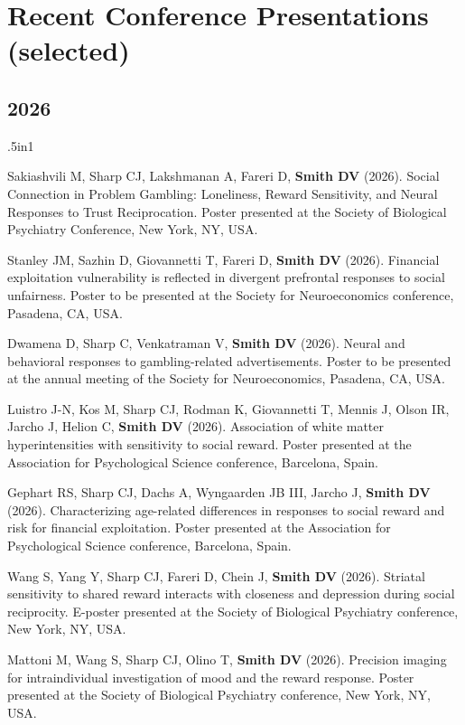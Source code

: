 \documentclass[11pt, letterpaper]{article}
\begin{document}

\section*{Recent Conference Presentations (selected)}
\label{sec:conferences}


\subsection*{2026}
\begin{hangparas}{.5in}{1}

Sakiashvili M, Sharp CJ, Lakshmanan A, Fareri D, \textbf{Smith DV} (2026). Social Connection in Problem Gambling: Loneliness, Reward Sensitivity, and Neural Responses to Trust Reciprocation. Poster presented at the Society of Biological Psychiatry Conference, New York, NY, USA.

Stanley JM, Sazhin D, Giovannetti T, Fareri D, \textbf{Smith DV} (2026). Financial exploitation vulnerability is reflected in divergent prefrontal responses to social unfairness. Poster to be presented at the Society for Neuroeconomics conference, Pasadena, CA, USA.

Dwamena D, Sharp C, Venkatraman V, \textbf{Smith DV} (2026). Neural and behavioral responses to gambling-related advertisements. Poster to be presented at the annual meeting of the Society for Neuroeconomics, Pasadena, CA, USA.

Luistro J-N, Kos M, Sharp CJ, Rodman K, Giovannetti T, Mennis J, Olson IR, Jarcho J, Helion C, \textbf{Smith DV} (2026). Association of white matter hyperintensities with sensitivity to social reward. Poster presented at the Association for Psychological Science conference, Barcelona, Spain.

Gephart RS, Sharp CJ, Dachs A, Wyngaarden JB III, Jarcho J, \textbf{Smith DV} (2026). Characterizing age-related differences in responses to social reward and risk for financial exploitation. Poster presented at the Association for Psychological Science conference, Barcelona, Spain.

Wang S, Yang Y, Sharp CJ, Fareri D, Chein J, \textbf{Smith DV} (2026). Striatal sensitivity to shared reward interacts with closeness and depression during social reciprocity. E-poster presented at the Society of Biological Psychiatry conference, New York, NY, USA.

Mattoni M, Wang S, Sharp CJ, Olino T, \textbf{Smith DV} (2026). Precision imaging for intraindividual investigation of mood and the reward response. Poster presented at the Society of Biological Psychiatry conference, New York, NY, USA.


\end{hangparas}
\end{document}
